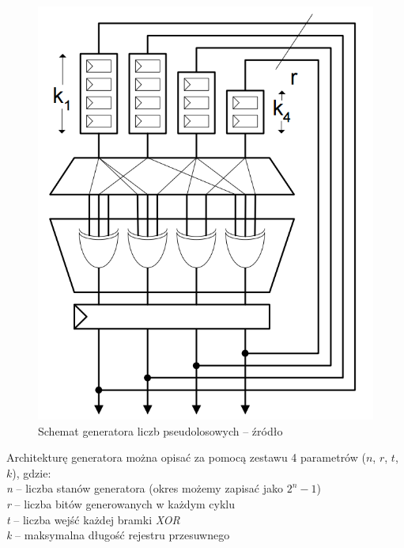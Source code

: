 	\begin{figure}[h!]
        \centering
		\includegraphics[scale=0.3]{img/4/rng_scheme.png}
		\caption{Schemat generatora liczb pseudolosowych -- źródło \cite{thomas_10}}
		\label{fig:fpga_rng}
	\end{figure}

Architekturę generatora można opisać za pomocą zestawu 4 parametrów ($n$, $r$, $t$, $k$), gdzie:\\
\-\hspace{1cm} \textit{n} -- liczba stanów generatora (okres możemy zapisać jako $2^n-1$)\\
\-\hspace{1cm} \textit{r} -- liczba bitów generowanych w każdym cyklu\\
\-\hspace{1cm} \textit{t} -- liczba wejść każdej bramki \textit{XOR}\\
\-\hspace{1cm} \textit{k} -- maksymalna długość rejestru przesuwnego\\

